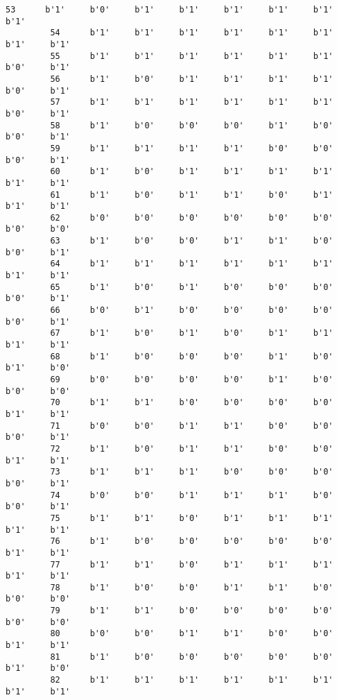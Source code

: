 \documentclass[11pt]{article}
\begin{document}
\begin{Verbatim}[commandchars=\\\{\}]
         53      b'1'     b'0'     b'1'     b'1'     b'1'     b'1'     b'1'     b'1'   
         54      b'1'     b'1'     b'1'     b'1'     b'1'     b'1'     b'1'     b'1'   
         55      b'1'     b'1'     b'1'     b'1'     b'1'     b'1'     b'0'     b'1'   
         56      b'1'     b'0'     b'1'     b'1'     b'1'     b'1'     b'0'     b'1'   
         57      b'1'     b'1'     b'1'     b'1'     b'1'     b'1'     b'0'     b'1'   
         58      b'1'     b'0'     b'0'     b'0'     b'1'     b'0'     b'0'     b'1'   
         59      b'1'     b'1'     b'1'     b'1'     b'0'     b'0'     b'0'     b'1'   
         60      b'1'     b'0'     b'1'     b'1'     b'1'     b'1'     b'1'     b'1'   
         61      b'1'     b'0'     b'1'     b'1'     b'0'     b'1'     b'1'     b'1'   
         62      b'0'     b'0'     b'0'     b'0'     b'0'     b'0'     b'0'     b'0'   
         63      b'1'     b'0'     b'0'     b'1'     b'1'     b'0'     b'0'     b'1'   
         64      b'1'     b'1'     b'1'     b'1'     b'1'     b'1'     b'1'     b'1'   
         65      b'1'     b'0'     b'1'     b'0'     b'0'     b'0'     b'0'     b'1'   
         66      b'0'     b'1'     b'0'     b'0'     b'0'     b'0'     b'0'     b'1'   
         67      b'1'     b'0'     b'1'     b'0'     b'1'     b'1'     b'1'     b'1'   
         68      b'1'     b'0'     b'0'     b'0'     b'1'     b'0'     b'1'     b'0'   
         69      b'0'     b'0'     b'0'     b'0'     b'1'     b'0'     b'0'     b'0'   
         70      b'1'     b'1'     b'0'     b'0'     b'0'     b'0'     b'1'     b'1'   
         71      b'0'     b'0'     b'1'     b'1'     b'0'     b'0'     b'0'     b'1'   
         72      b'1'     b'0'     b'1'     b'1'     b'0'     b'0'     b'1'     b'1'   
         73      b'1'     b'1'     b'1'     b'0'     b'0'     b'0'     b'0'     b'1'   
         74      b'0'     b'0'     b'1'     b'1'     b'1'     b'0'     b'0'     b'1'   
         75      b'1'     b'1'     b'0'     b'1'     b'1'     b'1'     b'1'     b'1'   
         76      b'1'     b'0'     b'0'     b'0'     b'0'     b'0'     b'1'     b'1'   
         77      b'1'     b'1'     b'0'     b'1'     b'1'     b'1'     b'1'     b'1'   
         78      b'1'     b'0'     b'0'     b'1'     b'1'     b'0'     b'0'     b'0'   
         79      b'1'     b'1'     b'0'     b'0'     b'0'     b'0'     b'0'     b'0'   
         80      b'0'     b'0'     b'1'     b'1'     b'0'     b'0'     b'1'     b'1'   
         81      b'1'     b'0'     b'0'     b'0'     b'0'     b'0'     b'1'     b'0'   
         82      b'1'     b'1'     b'1'     b'1'     b'1'     b'1'     b'1'     b'1'   

\end{Verbatim}
\end{document}
